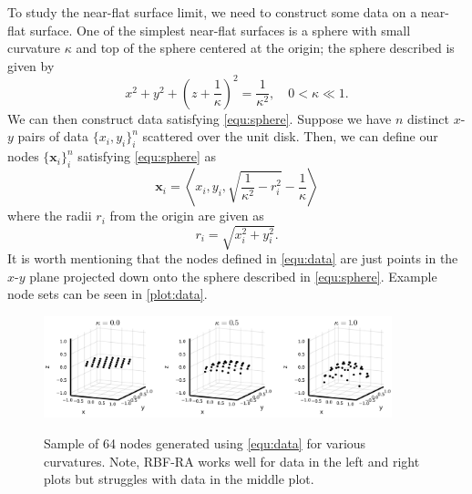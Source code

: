 \documentclass[a4paper,11pt]{article}
\newcommand{\bx}{\mathbf{x}}
\begin{document}
To study the near-flat surface limit, we need to construct some data on a near-flat surface. One of the simplest near-flat surfaces is a sphere with small curvature $ \kappa $ and top of the sphere centered at the origin; the sphere described is given by
\begin{equation}
	x^2 + y^2 + \left(z + \frac{1}{\kappa}\right)^2 = \frac{1}{\kappa^2}, \quad 0 < \kappa \ll 1. \label{equ:sphere}
\end{equation}
We can then construct data satisfying \eqref{equ:sphere}. Suppose we have $ n $ distinct $ x $-$ y $ pairs of data $ \{x_i, y_i\}_i^n $ scattered over the unit disk. Then, we can define our nodes $ \{\bx_i\}_i^n $ satisfying \eqref{equ:sphere} as
\begin{equation}
	\bx_i = \left\langle x_i, y_i, \sqrt{\frac{1}{\kappa^2} - r_i^2} - \frac{1}{\kappa} \right\rangle \label{equ:data}
\end{equation}
where the radii $ r_i $ from the origin are given as
\[
	r_i = \sqrt{x_i^2 + y_i^2}.
\]
It is worth mentioning that the nodes defined in \eqref{equ:data} are just points in the $ x $-$ y $ plane projected down onto the sphere described in \eqref{equ:sphere}. Example node sets can be seen in \autoref{plot:data}.

\begin{figure}[t]
	\centering
	\captionsetup{width = 0.9\textwidth}
	\caption{Sample of 64 nodes generated using \eqref{equ:data} for various curvatures. Note, RBF-RA works well for data in the left and right plots but struggles with data in the middle plot.}
	\includegraphics[width = 0.9\textwidth]{Images/Nodes.png}
	\label{plot:data}
\end{figure} 
\end{document}

